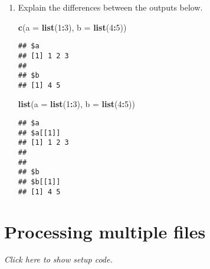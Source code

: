 \documentclass[]{book}
\newenvironment{Shaded}{\begin{snugshade}}{\end{snugshade}}
\newcommand{\DataTypeTok}[1]{\textcolor[rgb]{0.13,0.29,0.53}{#1}}
\newcommand{\DecValTok}[1]{\textcolor[rgb]{0.00,0.00,0.81}{#1}}
\newcommand{\KeywordTok}[1]{\textcolor[rgb]{0.13,0.29,0.53}{\textbf{#1}}}
\newcommand{\NormalTok}[1]{#1}
\newcommand{\OperatorTok}[1]{\textcolor[rgb]{0.81,0.36,0.00}{\textbf{#1}}}
\newcommand{\StringTok}[1]{\textcolor[rgb]{0.31,0.60,0.02}{#1}}
\begin{document}
\begin{enumerate}
\def\labelenumi{\arabic{enumi}.}
\item
  Explain the differences between the outputs below.

\begin{Shaded}
\begin{Highlighting}[]
\KeywordTok{c}\NormalTok{(}\DataTypeTok{a =} \KeywordTok{list}\NormalTok{(}\DecValTok{1}\OperatorTok{:}\DecValTok{3}\NormalTok{), }\DataTypeTok{b =} \KeywordTok{list}\NormalTok{(}\DecValTok{4}\OperatorTok{:}\DecValTok{5}\NormalTok{))}
\end{Highlighting}
\end{Shaded}

\begin{verbatim}
## $a
## [1] 1 2 3
## 
## $b
## [1] 4 5
\end{verbatim}

\begin{Shaded}
\begin{Highlighting}[]
\KeywordTok{list}\NormalTok{(}\DataTypeTok{a =} \KeywordTok{list}\NormalTok{(}\DecValTok{1}\OperatorTok{:}\DecValTok{3}\NormalTok{), }\DataTypeTok{b =} \KeywordTok{list}\NormalTok{(}\DecValTok{4}\OperatorTok{:}\DecValTok{5}\NormalTok{))}
\end{Highlighting}
\end{Shaded}

\begin{verbatim}
## $a
## $a[[1]]
## [1] 1 2 3
## 
## 
## $b
## $b[[1]]
## [1] 4 5
\end{verbatim}
\end{enumerate}

\hypertarget{map}{%
\section{Processing multiple files}\label{map}}

\emph{Click here to show setup code.}

\begin{Shaded}
\end{Shaded}
\end{document}

